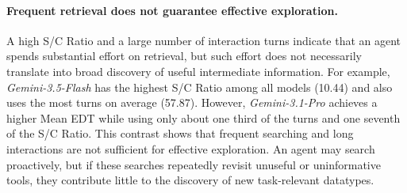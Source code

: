 \documentclass{llmxive}
\begin{document}


\paragraph{Frequent retrieval does not guarantee effective exploration.}
A high S/C Ratio and a large number of interaction turns indicate that an agent spends substantial effort on retrieval, but such effort does not necessarily translate into broad discovery of useful intermediate information.
For example, \textit{Gemini-3.5-Flash} has the highest S/C Ratio among all models (10.44) and also uses the most turns on average (57.87).
However, \textit{Gemini-3.1-Pro} achieves a higher Mean EDT while using only about one third of the turns and one seventh of the S/C Ratio.
This contrast shows that frequent searching and long interactions are not sufficient for effective exploration.
An agent may search proactively, but if these searches repeatedly revisit unuseful or uninformative tools, they contribute little to the discovery of new task-relevant datatypes.



\end{document}
